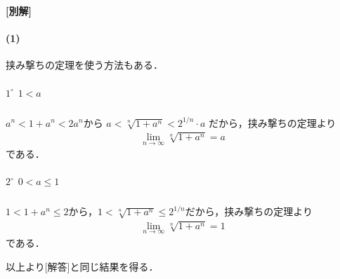 \documentclass[../../main.tex]{subfiles}
\begin{document}
{\bf [別解]}

\paragraph{(1)}

挟み撃ちの定理を使う方法もある．

\subparagraph{$1^\circ$ $1<a$}

$a^n<1+a^n<2a^n$から $a<\sqrt[n]{1+a^n}<2^{1/n}\cdot a$ だから，挟み撃ちの定理より
\begin{align}
  \lim_{n\to\infty}\sqrt[n]{1+a^n} = a
\end{align}
である．

\subparagraph{$2^\circ$ $0<a\le1$}

$1<1+a^n\le2$から，$1<\sqrt[n]{1+a^n} \le 2^{1/n}$だから，挟み撃ちの定理より
\begin{align}
  \lim_{n\to\infty}\sqrt[n]{1+a^n} = 1
\end{align}
である．
\casesend

以上より[解答]と同じ結果を得る．


\newpage
\end{document}

